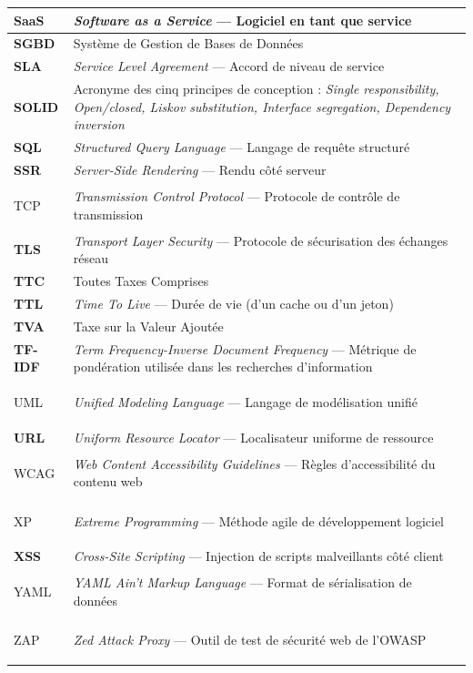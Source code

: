 \begin{longtable}{|>{\bfseries\color{primary}}m{3.2cm}|>{\RaggedRight\arraybackslash}m{11.5cm}|}
SaaS  & \textit{Software as a Service} — Logiciel en tant que service \\
\hline
SGBD  & Système de Gestion de Bases de Données \\
\hline
SLA   & \textit{Service Level Agreement} — Accord de niveau de service \\
\hline
SOLID & Acronyme des cinq principes de conception : \textit{Single responsibility, Open/closed, Liskov substitution, Interface segregation, Dependency inversion} \\
\hline
SQL   & \textit{Structured Query Language} — Langage de requête structuré \\
\hline
SSR   & \textit{Server-Side Rendering} — Rendu côté serveur \\
\hline

TCP   & \textit{Transmission Control Protocol} — Protocole de contrôle de transmission \\
\hline
TLS   & \textit{Transport Layer Security} — Protocole de sécurisation des échanges réseau \\
\hline
TTC   & Toutes Taxes Comprises \\
\hline
TTL   & \textit{Time To Live} — Durée de vie (d'un cache ou d'un jeton) \\
\hline
TVA   & Taxe sur la Valeur Ajoutée \\
\hline
TF-IDF & \textit{Term Frequency-Inverse Document Frequency} — Métrique de pondération utilisée dans les recherches d'information \\
\hline 

UML   & \textit{Unified Modeling Language} — Langage de modélisation unifié \\
\hline
URL   & \textit{Uniform Resource Locator} — Localisateur uniforme de ressource \\
\hline

WCAG  & \textit{Web Content Accessibility Guidelines} — Règles d'accessibilité du contenu web \\
\hline

XP    & \textit{Extreme Programming} — Méthode agile de développement logiciel \\
\hline
XSS   & \textit{Cross-Site Scripting} — Injection de scripts malveillants côté client \\
\hline

YAML  & \textit{YAML Ain't Markup Language} — Format de sérialisation de données \\
\hline

ZAP   & \textit{Zed Attack Proxy} — Outil de test de sécurité web de l'OWASP \\
\hline

\end{longtable}
